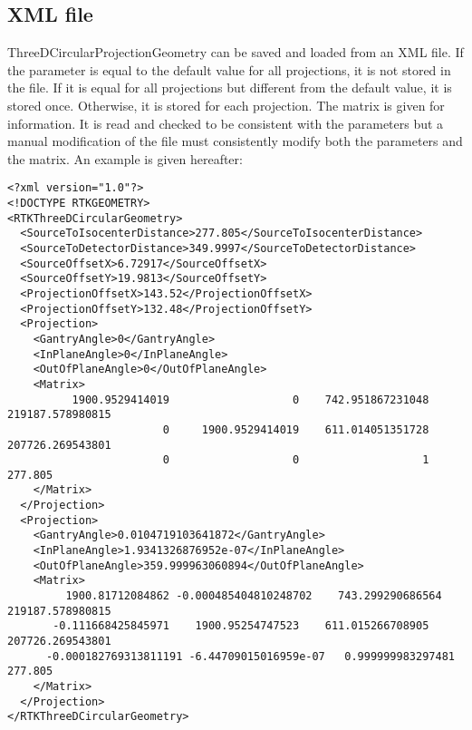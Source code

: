 \documentclass{article}
\begin{document}
\subsection{XML file}

ThreeDCircularProjectionGeometry can be saved and loaded from an XML file. If the parameter is equal to the default value for all projections, it is not stored in the file. If it is equal for all projections but different from the default value, it is stored once. Otherwise, it is stored for each projection. The matrix is given for information. It is read and checked to be consistent with the parameters but a manual modification of the file must consistently modify both the parameters and the matrix. An example is given hereafter:

\begin{verbatim}
<?xml version="1.0"?>
<!DOCTYPE RTKGEOMETRY>
<RTKThreeDCircularGeometry>
  <SourceToIsocenterDistance>277.805</SourceToIsocenterDistance>
  <SourceToDetectorDistance>349.9997</SourceToDetectorDistance>
  <SourceOffsetX>6.72917</SourceOffsetX>
  <SourceOffsetY>19.9813</SourceOffsetY>
  <ProjectionOffsetX>143.52</ProjectionOffsetX>
  <ProjectionOffsetY>132.48</ProjectionOffsetY>
  <Projection>
    <GantryAngle>0</GantryAngle>
    <InPlaneAngle>0</InPlaneAngle>
    <OutOfPlaneAngle>0</OutOfPlaneAngle>
    <Matrix>
          1900.9529414019                   0    742.951867231048    219187.578980815
                        0     1900.9529414019    611.014051351728    207726.269543801
                        0                   0                   1             277.805
    </Matrix>
  </Projection>
  <Projection>
    <GantryAngle>0.0104719103641872</GantryAngle>
    <InPlaneAngle>1.9341326876952e-07</InPlaneAngle>
    <OutOfPlaneAngle>359.999963060894</OutOfPlaneAngle>
    <Matrix>
         1900.81712084862 -0.000485404810248702    743.299290686564    219187.578980815
       -0.111668425845971    1900.95254747523    611.015266708905    207726.269543801
      -0.000182769313811191 -6.44709015016959e-07   0.999999983297481             277.805
    </Matrix>
  </Projection>
</RTKThreeDCircularGeometry>
\end{verbatim}
\end{document}
